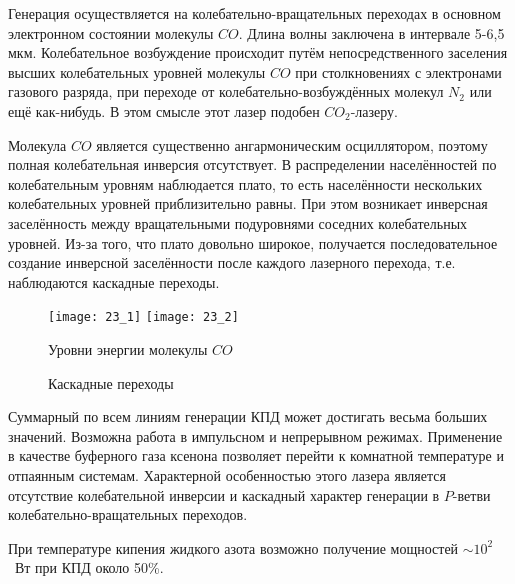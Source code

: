 Генерация осуществляется на колебательно-вращательных переходах в основном
электронном состоянии молекулы \( CO \). Длина волны заключена в интервале
5-6,5 мкм. Колебательное возбуждение происходит путём непосредственного
заселения высших колебательных уровней молекулы \( CO \) при столкновениях с
электронами газового разряда, при переходе от колебательно-возбуждённых
молекул \( N_2 \) или ещё как-нибудь. В этом смысле этот лазер подобен
\( CO_2 \)-лазеру.

Молекула \( CO \) является существенно ангармоническим осциллятором, поэтому
полная колебательная инверсия отсутствует. В распределении
населённостей по колебательным уровням наблюдается плато, то есть населённости
нескольких колебательных уровней приблизительно равны. При этом возникает
инверсная заселённость между вращательными подуровнями соседних колебательных
уровней. Из-за того, что плато довольно широкое, получается последовательное
создание инверсной заселённости после каждого лазерного перехода, т.е.
наблюдаются каскадные переходы.

\begin{figure}[h]
    \center
    \texttt{[image: 23\_1]}\hfill
    \texttt{[image: 23\_2]}
    \parbox[t]{.47\textwidth}{\caption{Уровни энергии молекулы \( CO \)}}\hfill
    \parbox[t]{.47\textwidth}{\caption{Каскадные переходы}}
\end{figure}


Суммарный по всем линиям генерации КПД может достигать весьма больших
значений. Возможна работа в импульсном и непрерывном режимах. Применение в
качестве буферного газа ксенона позволяет перейти к комнатной температуре и
отпаянным системам. Характерной особенностью этого лазера является отсутствие
колебательной инверсии и каскадный характер генерации в \( P \)-ветви
колебательно-вращательных переходов.

При температуре кипения жидкого азота возможно получение мощностей
\( \sim 10^2 \)~Вт при КПД около 50\%.
